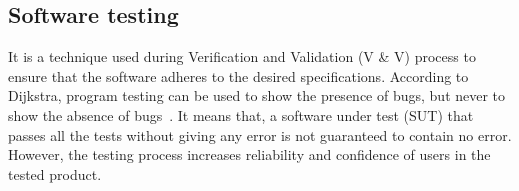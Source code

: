

\subsection{Software testing} 
It is a technique used during Verification and Validation (V \& V) process to ensure that the software adheres to the desired specifications. According to Dijkstra, program testing can be used to show the presence of bugs, but never to show the absence of bugs~\cite{dahl1972structured}. It means that, a software under test (SUT) that passes all the tests without giving any error is not guaranteed to contain no error. However, the testing process increases reliability and confidence of users in the tested product.

